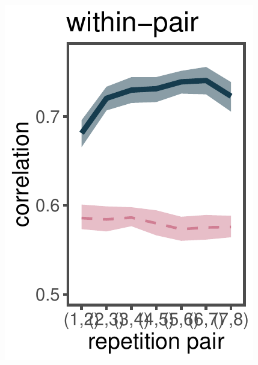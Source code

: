 \documentclass[10pt,letterpaper]{article}
\begin{document}
\begin{figure}
\includegraphics[width=\linewidth/2-1]{figures/within.pdf}

\end{figure}
\end{document}

